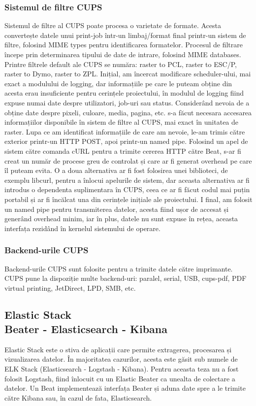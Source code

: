 \documentclass[a4paper, 12pt, twoside]{report}
\begin{document}
			\subsubsection{Sistemul de filtre CUPS}
Sistemul de filtre al CUPS poate procesa o varietate de formate. Acesta convertește datele unui print-job într-un limbaj/format final printr-un sistem de filtre, folosind MIME types pentru identificarea formatelor.
Procesul de filtrare începe prin determinarea tipului de date de intrare, folosind MIME databases. Printre filtrele default ale CUPS se număra: raster to PCL, raster to ESC/P, raster to Dymo, raster to ZPL.
Inițial, am încercat modificare scheduler-ului, mai exact a modulului de logging, dar informațiile pe care le puteam obține din acesta erau insuficiente pentru cerințele proiectului, în modulul de logging fiind expuse numai date despre utilizatori, job-uri sau status. Considerând nevoia de a obține date despre pixeli, culoare, media, pagina, etc. s-a făcut necesara accesarea informațiilor disponibile în sistem de filtre al CUPS, mai exact în unitatea de raster. Lupa ce am identificat informațiile de care am nevoie, le-am trimis către exterior printr-un HTTP POST, apoi printr-un named pipe. Folosind un apel de sistem către comanda cURL pentru a trimite cererea HTTP către Beat, s-ar fi creat un număr de procese greu de controlat și care ar fi generat overhead pe care îl puteam evita. O a doua alternativa ar fi fost folosirea unei biblioteci, de exemplu libcurl, pentru a înlocui apelurile de sistem, dar aceasta alternativa ar fi introdus o dependenta suplimentara în CUPS, ceea ce ar fi făcut codul mai puțin portabil și ar fi încălcat una din cerințele inițiale ale proiectului. I final, am folosit un named pipe pentru transmiterea datelor, acesta fiind ușor de accesat și generând overhead minim, iar în plus, datele nu sunt expuse în rețea, aceasta interfața rezidând în kernelul sistemului de operare.


			\subsubsection{Backend-urile CUPS}
Backend-urile CUPS sunt folosite pentru a trimite datele către imprimante. CUPS pune la dispoziție multe backend-uri: paralel, serial, USB, cups-pdf, PDF virtual printing, JetDirect, LPD, SMB, etc.
		
		
		\subsection[Elastic Stack]{Elastic Stack\\ {\normalsize Beater - Elasticsearch - Kibana}}
Elastic Stack este o stiva de aplicații care permite extragerea, procesarea și vizualizarea datelor. În majoritatea cazurilor, acesta este găsit sub numele de ELK Stack (Elasticsearch - Logstash - Kibana). Pentru aceasta teza nu a fost folosit Logstash, fiind înlocuit cu un Elastic Beater ca unealta de colectare a datelor. Un Beat implementează interfața Beater și aduna date spre a le trimite către Kibana sau, în cazul de fata, Elasticsearch.
\end{document}
